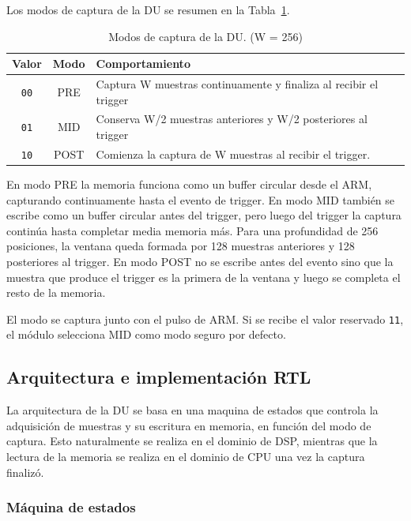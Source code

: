 \documentclass[10pt,a4paper]{article}
\begin{document}
Los modos de captura de la DU se resumen en la Tabla~\ref{tab:du-modos}.

\begin{table}[H]
    \centering
    \caption{Modos de captura de la DU. (W = 256)}
    \label{tab:du-modos}
    \begin{tabular}{ccl}
        \toprule
        \textbf{Valor} & \textbf{Modo} & \textbf{Comportamiento} \\
        \midrule
        \texttt{00} & PRE  & Captura W muestras continuamente y finaliza al recibir el trigger \\
        \texttt{01} & MID  & Conserva W/2 muestras anteriores y W/2 posteriores al trigger \\
        \texttt{10} & POST & Comienza la captura de W muestras al recibir el trigger. \\
        \bottomrule
    \end{tabular}
\end{table}

En modo PRE la memoria funciona como un buffer circular desde el ARM, capturando continuamente
hasta el evento de trigger. En modo MID también se escribe como un buffer circular antes del 
trigger, pero luego del trigger la captura continúa hasta completar media memoria más.
Para una profundidad de 256 posiciones, la ventana queda formada por 128 muestras anteriores 
y 128 posteriores al trigger. En modo POST no se escribe antes del evento sino que la muestra 
que produce el trigger es la primera de la ventana y luego se completa el resto de la memoria.

El modo se captura junto con el pulso de ARM. Si se recibe el valor reservado
\texttt{11}, el módulo selecciona MID como modo seguro por defecto.

\subsection{Arquitectura e implementación RTL}

La arquitectura de la DU se basa en una maquina de estados que controla la adquisición
de muestras y su escritura en memoria, en función del modo de captura. Esto naturalmente
se realiza en el dominio de DSP, mientras que la lectura de la memoria se realiza en el
dominio de CPU una vez la captura finalizó.

\subsubsection*{Máquina de estados}
\end{document}
